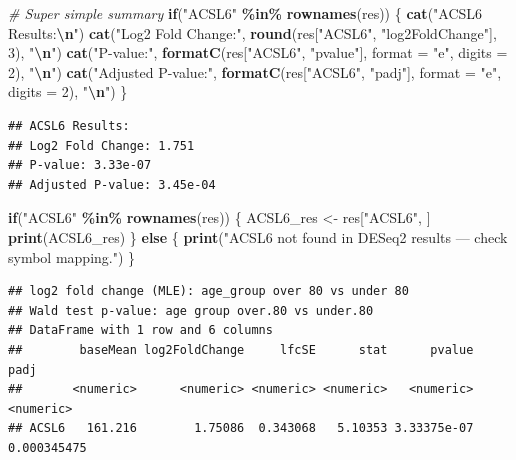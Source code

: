 \documentclass[
]{article}
\newenvironment{Shaded}{\begin{snugshade}}{\end{snugshade}}
\newcommand{\AttributeTok}[1]{\textcolor[rgb]{0.13,0.29,0.53}{#1}}
\newcommand{\CommentTok}[1]{\textcolor[rgb]{0.56,0.35,0.01}{\textit{#1}}}
\newcommand{\ControlFlowTok}[1]{\textcolor[rgb]{0.13,0.29,0.53}{\textbf{#1}}}
\newcommand{\DecValTok}[1]{\textcolor[rgb]{0.00,0.00,0.81}{#1}}
\newcommand{\FunctionTok}[1]{\textcolor[rgb]{0.13,0.29,0.53}{\textbf{#1}}}
\newcommand{\NormalTok}[1]{#1}
\newcommand{\OtherTok}[1]{\textcolor[rgb]{0.56,0.35,0.01}{#1}}
\newcommand{\SpecialCharTok}[1]{\textcolor[rgb]{0.81,0.36,0.00}{\textbf{#1}}}
\newcommand{\StringTok}[1]{\textcolor[rgb]{0.31,0.60,0.02}{#1}}
\begin{document}
\begin{Shaded}
\begin{Highlighting}[]
\CommentTok{\# Super simple summary}
\ControlFlowTok{if}\NormalTok{(}\StringTok{"ACSL6"} \SpecialCharTok{\%in\%} \FunctionTok{rownames}\NormalTok{(res)) \{}
  \FunctionTok{cat}\NormalTok{(}\StringTok{"ACSL6 Results:}\SpecialCharTok{\textbackslash{}n}\StringTok{"}\NormalTok{)}
  \FunctionTok{cat}\NormalTok{(}\StringTok{"Log2 Fold Change:"}\NormalTok{, }\FunctionTok{round}\NormalTok{(res[}\StringTok{"ACSL6"}\NormalTok{, }\StringTok{"log2FoldChange"}\NormalTok{], }\DecValTok{3}\NormalTok{), }\StringTok{"}\SpecialCharTok{\textbackslash{}n}\StringTok{"}\NormalTok{)}
  \FunctionTok{cat}\NormalTok{(}\StringTok{"P{-}value:"}\NormalTok{, }\FunctionTok{formatC}\NormalTok{(res[}\StringTok{"ACSL6"}\NormalTok{, }\StringTok{"pvalue"}\NormalTok{], }\AttributeTok{format =} \StringTok{"e"}\NormalTok{, }\AttributeTok{digits =} \DecValTok{2}\NormalTok{), }\StringTok{"}\SpecialCharTok{\textbackslash{}n}\StringTok{"}\NormalTok{)}
  \FunctionTok{cat}\NormalTok{(}\StringTok{"Adjusted P{-}value:"}\NormalTok{, }\FunctionTok{formatC}\NormalTok{(res[}\StringTok{"ACSL6"}\NormalTok{, }\StringTok{"padj"}\NormalTok{], }\AttributeTok{format =} \StringTok{"e"}\NormalTok{, }\AttributeTok{digits =} \DecValTok{2}\NormalTok{), }\StringTok{"}\SpecialCharTok{\textbackslash{}n}\StringTok{"}\NormalTok{)}
\NormalTok{\}}
\end{Highlighting}
\end{Shaded}

\begin{verbatim}
## ACSL6 Results:
## Log2 Fold Change: 1.751 
## P-value: 3.33e-07 
## Adjusted P-value: 3.45e-04
\end{verbatim}

\begin{Shaded}
\begin{Highlighting}[]
\ControlFlowTok{if}\NormalTok{(}\StringTok{"ACSL6"} \SpecialCharTok{\%in\%} \FunctionTok{rownames}\NormalTok{(res)) \{}
\NormalTok{  ACSL6\_res }\OtherTok{\textless{}{-}}\NormalTok{ res[}\StringTok{"ACSL6"}\NormalTok{, ]}
  \FunctionTok{print}\NormalTok{(ACSL6\_res)}
\NormalTok{\} }\ControlFlowTok{else}\NormalTok{ \{}
  \FunctionTok{print}\NormalTok{(}\StringTok{"ACSL6 not found in DESeq2 results — check symbol mapping."}\NormalTok{)}
\NormalTok{\}}
\end{Highlighting}
\end{Shaded}

\begin{verbatim}
## log2 fold change (MLE): age_group over 80 vs under 80 
## Wald test p-value: age group over.80 vs under.80 
## DataFrame with 1 row and 6 columns
##        baseMean log2FoldChange     lfcSE      stat      pvalue        padj
##       <numeric>      <numeric> <numeric> <numeric>   <numeric>   <numeric>
## ACSL6   161.216        1.75086  0.343068   5.10353 3.33375e-07 0.000345475
\end{verbatim}
\end{document}
